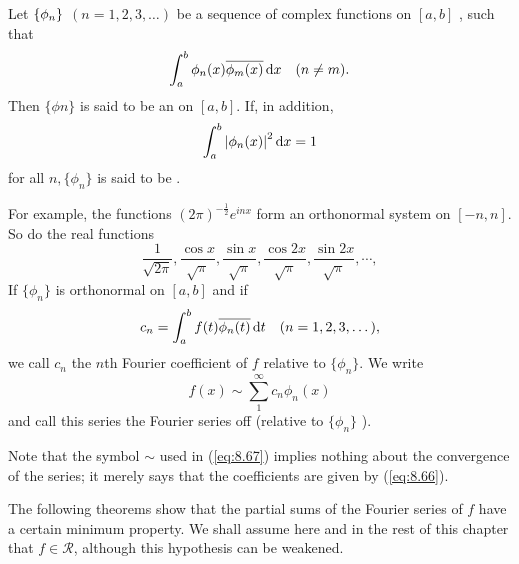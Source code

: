 \begin{mydef}
    \label{mydef:8.10}
    Let $\protect\{\phi_n\}$ $(n = 1,2,3,\dots)$ be a sequence of complex functions on $[a,b]$ , such that 
    \begin{equation}
        \label{eq:8.64}
        \int_{a}^{b} \phi_n (x) \overline{\phi_m (x)} \d x
        \quad (n \neq m).
    \end{equation}
    Then $\{\phi n\}$ is said to be an  on $[a, b]$. 
    If, in addition,
    \begin{equation}
        \label{eq:8.65}
        \int_{a}^{b} \left| \phi_n(x) \right|^2 \d x = 1
    \end{equation}
    for all $n, \{\phi_n\}$ is said to be .

    For example, the functions $(2\pi)^{-\frac{1}{2}}e^{inx}$ form an orthonormal system on $[-n, n]$. 
    So do the real functions
    \begin{equation*}
        \frac{1}{\sqrt{2\pi}},
        \frac{\cos x}{\sqrt{\pi}},
        \frac{\sin x}{\sqrt{\pi}},
        \frac{\cos 2x}{\sqrt{\pi}},
        \frac{\sin 2x}{\sqrt{\pi}}, \cdots ,
    \end{equation*}
    If $\{\phi_n\}$ is orthonormal on $[a,b]$ and if 
    \begin{equation}
        \label{eq:8.66}
        c_n = \int_{a}^{b} f(t) \overline{\phi_n(t)} \d t
        \quad 
        (n=1,2,3,\dots),
    \end{equation}
    we call $c_n$ the $n$th Fourier coefficient of $f$ relative to $\{\phi_n\}$.
    We write 
    \begin{equation}
        \label{eq:8.67}
        f(x) \sim \sum_{1}^{\infty} c_n \phi_n (x)
    \end{equation}
    and call this series the Fourier series off (relative to $\{ \phi_n\}$ ).
    
    Note that the symbol $\sim$ used in (\ref{eq:8.67}) implies nothing about the convergence of the series; it merely says that the coefficients are given by (\ref{eq:8.66}).

    The following theorems show that the partial sums of the Fourier series of $f$ have a certain minimum property. 
    We shall assume here and in the rest of this chapter that
    $f \in \mathscr{R}$, although this hypothesis can be weakened.
\end{mydef}


